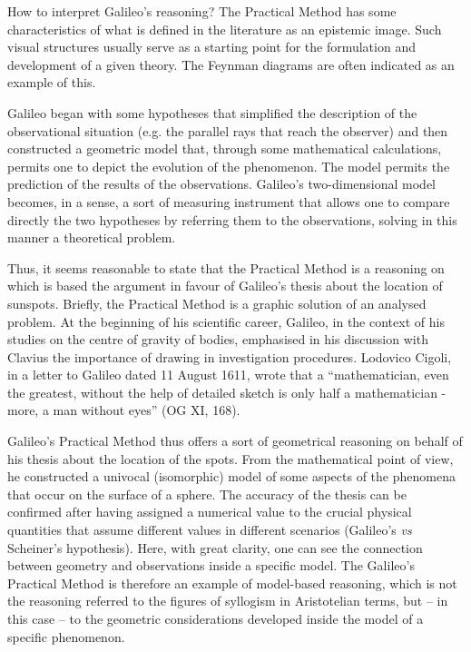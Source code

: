 \begin{artengenv}
How to interpret Galileo’s reasoning? The Practical Method has some characteristics of what is defined in the literature
as an epistemic image. Such visual structures usually serve as a starting point for the formulation and development of
a given theory. The Feynman diagrams are often indicated as an example of this.

Galileo began with some hypotheses that simplified the description of the observational situation (e.g. the parallel
rays that reach the observer) and then constructed a geometric model that, through some mathematical calculations,
permits one to depict the evolution of the phenomenon. The model permits the prediction of the results of the
observations. Galileo’s two-dimensional model becomes, in a sense, a sort of measuring instrument that allows one to
compare directly the two hypotheses by referring them to the observations, solving in this manner a theoretical
problem. 

Thus, it seems reasonable to state that the Practical Method is a reasoning on which is based the argument in favour of
Galileo’s thesis about the location of sunspots. Briefly, the Practical Method is a graphic solution of an analysed
problem. At the beginning of his scientific career, Galileo, in the context of his studies on the centre of gravity of
bodies, emphasised in his discussion with Clavius the importance of drawing in investigation procedures. Lodovico
Cigoli, in a letter to Galileo dated 11 August 1611, wrote that a ``mathematician, even the greatest, without the help
of detailed sketch is only half a mathematician - more, a man without eyes'' (OG XI, 168).

Galileo’s Practical Method thus offers a sort of geometrical reasoning on behalf of his thesis about the location of the
spots. From the mathematical point of view, he constructed a univocal (isomorphic) model of some aspects of the
phenomena that occur on the surface of a sphere. The accuracy of the thesis can be confirmed after having assigned a
numerical value to the crucial physical quantities that assume different values in different scenarios (Galileo’s
\textit{vs} Scheiner’s hypothesis). Here, with great clarity, one can see the connection between geometry and
observations inside a specific model. The Galileo’s Practical Method is therefore an example of model-based reasoning,
which is not the reasoning referred to the figures of syllogism in Aristotelian terms, but -- in this case -- to the
geometric considerations developed inside the model of a specific phenomenon. 


\end{artengenv}
